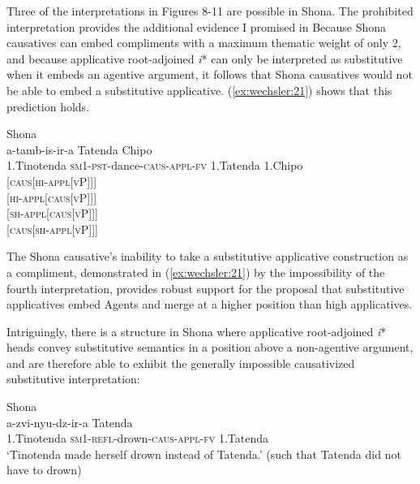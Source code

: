 \documentclass[output=paper,modfonts,nonflat,colorlinks,citecolor=brown]{langsci/langscibook}
\begin{document}
Three of the interpretations in Figures 8-11 are possible in Shona. The prohibited interpretation provides the additional evidence I promised in  Because Shona causatives can embed compliments with a maximum thematic weight of only 2, and because applicative root-adjoined \textit{i}* can only be interpreted as substitutive when it embeds an agentive argument, it follows that Shona causatives would not be able to embed a substitutive applicative. (\ref{ex:wechsler:21}) shows that this prediction holds. 


\ea\label{ex:wechsler:21}
Shona\\
  {a-tamb-is-ir-a}                                                                      {Tatenda} {Chipo}\\
1.Tinotenda  \textsc{sm1-pst}{}-dance-\textsc{caus-appl-fv}  1.Tatenda  1.Chipo\\

   \textsc{[caus[hi-appl[vP]]]}\\
  \textsc{[hi-appl[caus[vP]]]}\\
  \textsc{[sh-appl[caus[vP]]]}\\
  {\textsc{[caus[sh-appl[vP]]]}}\\
\z


The Shona causative’s inability to take a substitutive applicative construction as a compliment, demonstrated in (\ref{ex:wechsler:21}) by the impossibility of the fourth interpretation, provides robust support for the proposal that substitutive applicatives embed Agents and merge at a higher position than high applicatives. 



Intriguingly, there is a structure in Shona where applicative root-adjoined \textit{i}* heads convey substitutive semantics in a position above a non-agentive argument, and are therefore able to exhibit the generally impossible causativized substitutive interpretation:


\ea\label{ex:wechsler:22}
Shona\\
  {a-zvi-nyu-dz-ir-a} {Tatenda}\\
1.Tinotenda  \textsc{sm1-refl-}drown\textsc{{}-caus-appl-fv}  1.Tatenda\\
\glt ‘Tinotenda made herself drown instead of Tatenda.'
(such that Tatenda did not have to drown)\\
\z
\end{document}
